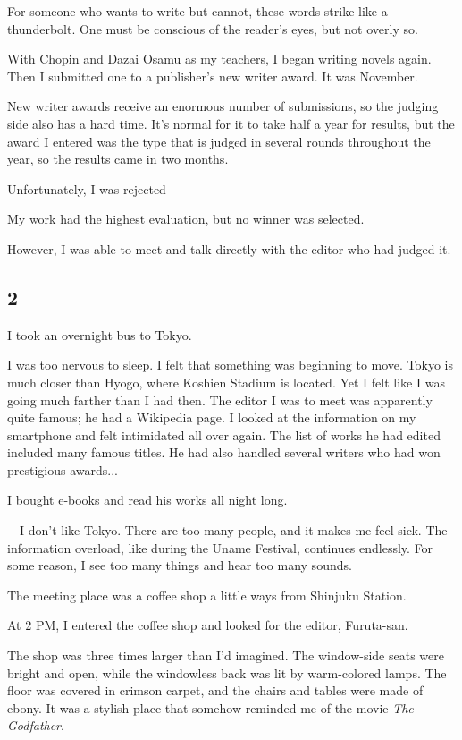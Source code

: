 \documentclass[
    a4paper,
    12pt,
    twoside,
    openany,
    UTF8,
    fontset=windows
]{ctexbook}
\begin{document}
For someone who wants to write but cannot, these words strike like a thunderbolt. One must be conscious of the reader's eyes, but not overly so.

With Chopin and Dazai Osamu as my teachers, I began writing novels again. Then I submitted one to a publisher's new writer award. It was November.

New writer awards receive an enormous number of submissions, so the judging side also has a hard time. It's normal for it to take half a year for results, but the award I entered was the type that is judged in several rounds throughout the year, so the results came in two months.

Unfortunately, I was rejected——

My work had the highest evaluation, but no winner was selected.

However, I was able to meet and talk directly with the editor who had judged it.


\subsection*{2}

I took an overnight bus to Tokyo.

I was too nervous to sleep. I felt that something was beginning to move. Tokyo is much closer than Hyogo, where Koshien Stadium is located. Yet I felt like I was going much farther than I had then. The editor I was to meet was apparently quite famous; he had a Wikipedia page. I looked at the information on my smartphone and felt intimidated all over again. The list of works he had edited included many famous titles. He had also handled several writers who had won prestigious awards...

I bought e-books and read his works all night long.

---I don't like Tokyo. There are too many people, and it makes me feel sick. The information overload, like during the Uname Festival, continues endlessly. For some reason, I see too many things and hear too many sounds.

The meeting place was a coffee shop a little ways from Shinjuku Station.

At 2 PM, I entered the coffee shop and looked for the editor, Furuta-san.

The shop was three times larger than I'd imagined. The window-side seats were bright and open, while the windowless back was lit by warm-colored lamps. The floor was covered in crimson carpet, and the chairs and tables were made of ebony. It was a stylish place that somehow reminded me of the movie \textit{The Godfather}.
\end{document}
